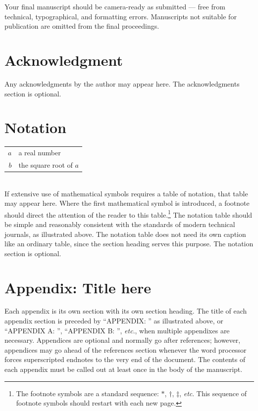 \documentclass[letterpaper, preprint, paper,11pt]{AAS}	%
\begin{document}
Your final manuscript should be camera-ready as submitted --- free from technical, typographical, and formatting errors. Manuscripts not suitable for publication are omitted from the final proceedings.


\section{Acknowledgment}
Any acknowledgments by the author may appear here. The acknowledgments section is optional.






\section{Notation}
\begin{tabular}{r l}
	$a$ & a real number \\
	$b$ &  the square root of $a$ \\
\end{tabular} \\

If extensive use of mathematical symbols requires a table of notation, that table may appear here. Where the first mathematical symbol is introduced, a footnote should direct the attention of the reader to this table.\footnote{The footnote symbols are a standard sequence: $\ast$, $\dagger$, $\ddag$, \emph{etc}. This sequence of footnote symbols should restart with each new page.}  The notation table should be simple and reasonably consistent with the standards of modern technical journals, as illustrated above. The notation table does not need its own caption like an ordinary table, since the section heading serves this purpose. The notation section is optional.





\appendix
\section*{Appendix: Title here}
Each appendix is its own section with its own section heading. The title of each appendix section is preceded by ``APPENDIX: '' as illustrated above, or ``APPENDIX A: '', ``APPENDIX B: '', \emph{etc}., when multiple appendixes are necessary. Appendices are optional and normally go after references; however, appendices may go ahead of the references section whenever the word processor forces superscripted endnotes to the very end of the document. The contents of each appendix must be called out at least once in the body of the manuscript.
\end{document}
